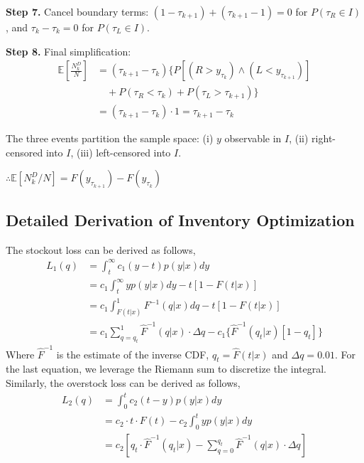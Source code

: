 \documentclass[sigconf]{acmart}
\begin{document}
\textbf{Step 7.} Cancel boundary terms:
$(1-\tau_{k+1}) + (\tau_{k+1}-1) = 0$ for $P(\tau_R \in I)$, and $\tau_k - \tau_k = 0$ for $P(\tau_L \in I)$.

\textbf{Step 8.} Final simplification:
\begin{align*}
\mathbb{E}\left[\frac{N_k^D}{N}\right] &= (\tau_{k+1}-\tau_k) \big\{ P[(R > y_{\tau_k}) \wedge (L < y_{\tau_{k+1}})] \\
&\quad + P(\tau_R < \tau_k) + P(\tau_L > \tau_{k+1}) \big\} \\
&= (\tau_{k+1}-\tau_k) \cdot 1 = \tau_{k+1} - \tau_k
\end{align*}

The three events partition the sample space: (i) $y$ observable in $I$, (ii) right-censored into $I$, (iii) left-censored into $I$.

$\therefore \mathbb{E}[N_k^D/N] = F(y_{\tau_{k+1}}) - F(y_{\tau_k})$


\subsection{Detailed Derivation of Inventory Optimization}
The stockout loss can be derived as follows,
\begin{align*}
    L_1(q) & = \int_{t}^{\infty}c_1(y - t)p(y|x) dy \\
    & = c_1\int_{t}^{\infty}yp(y|x)dy - t[1 - F(t|x)] \\
    & = c_1\int_{F(t|x)}^{1}F^{-1}(q|x) dq - t[1 - F(t|x)]\\
    & = c_1\sum_{q = q_t}^{1} \hat{F}^{-1}(q|x) \cdot \Delta q -  c_1\{\hat{F}^{-1}(q_t|x)[1 - q_t]\}
\end{align*}
Where $\hat{F}^{-1}$ is the estimate of the inverse CDF, $q_t = \hat{F}(t|x)$ and $\Delta q = 0.01$.  For the last equation, we leverage the Riemann sum to discretize the integral. Similarly, the overstock loss can be derived as follows,
\begin{align*}
    L_2(q) & = \int_{0}^{t}c_2(t - y)p(y|x)dy \\
    & = c_2 \cdot t \cdot F(t) - c_2 \int_{0}^{t}yp(y|x)dy \\
    &= c_2[q_t \cdot \hat{F}^{-1}(q_t|x)  - \sum_{q = 0}^{q_t}\hat{F}^{-1}(q|x) \cdot \Delta q ]
\end{align*}
\end{document}
